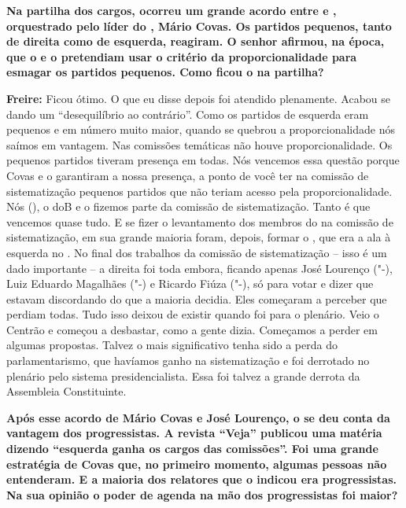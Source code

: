 \textbf{Na partilha dos cargos, ocorreu um grande acordo entre  e
, orquestrado pelo líder do , Mário Covas. Os partidos pequenos,
tanto de direita como de esquerda, reagiram. O senhor afirmou, na época,
que o  e o  pretendiam usar o critério da proporcionalidade para
esmagar os partidos pequenos. Como ficou o  na partilha?}

\textbf{Freire:} Ficou ótimo. O que eu disse depois foi atendido
plenamente. Acabou se dando um ``desequilíbrio ao contrário''. Como os
partidos de esquerda eram pequenos e em número muito maior, quando se
quebrou a proporcionalidade nós saímos em vantagem. Nas comissões
temáticas não houve proporcionalidade. Os pequenos partidos tiveram
presença em todas. Nós vencemos essa questão porque Covas e o 
garantiram a nossa presença, a ponto de você ter na comissão de
sistematização pequenos partidos que não teriam acesso pela
proporcionalidade. Nós (), o doB e o  fizemos parte da comissão
de sistematização. Tanto é que vencemos quase tudo. E se fizer o
levantamento dos membros do  na comissão de sistematização, em sua
grande maioria foram, depois, formar o , que era a ala à esquerda no
. No final dos trabalhos da comissão de sistematização -- isso é um
dado importante -- a direita foi toda embora, ficando apenas José
Lourenço ("-), Luiz Eduardo Magalhães ("-) e Ricardo Fiúza
("-), só para votar e dizer que estavam discordando do que a maioria
decidia. Eles começaram a perceber que perdiam todas. Tudo isso deixou
de existir quando foi para o plenário. Veio o Centrão e começou a
desbastar, como a gente dizia. Começamos a perder em algumas propostas.
Talvez o mais significativo tenha sido a perda do parlamentarismo, que
havíamos ganho na sistematização e foi derrotado no plenário pelo
sistema presidencialista. Essa foi talvez a grande derrota da Assembleia
Constituinte.

\textbf{Após esse acordo de Mário Covas e José Lourenço, o  se deu
conta da vantagem dos progressistas. A revista ``Veja'' publicou uma
matéria dizendo ``esquerda ganha os cargos das comissões''. Foi uma
grande estratégia de Covas que, no primeiro momento, algumas pessoas não
entenderam. E a maioria dos relatores que o  indicou era
progressistas. Na sua opinião o poder de agenda na mão dos progressistas
foi maior?}

